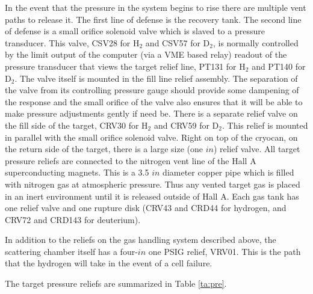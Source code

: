 \begin{safetyen}{10}{5}
In the event that the pressure in the system begins to rise there are multiple
vent paths to release it. The first line of defense is the recovery tank.
The second line of defense is a small orifice solenoid valve
which is slaved to a pressure transducer. This valve, CSV28 for H$_2$ and
CSV57 for D$_2$, 
is normally controlled by the limit
output of the computer (via a VME based relay) readout of
the pressure transducer that views the target
relief line, PT131 for H$_2$ and PT140 for D$_2$. The valve itself is mounted
in the fill line relief assembly. The separation of the valve from its
controlling pressure gauge should provide some dampening of the response
and the small orifice of the valve also ensures that it will
be able to make pressure adjustments gently if need be.
There is 
a separate relief valve on the fill side of the target, CRV30 for H$_2$ and
CRV59 for D$_2$. This relief is mounted in parallel with the small orifice 
solenoid valve. Right on top of the cryocan, on the return side of the target,
there is a large size (one $in$) relief valve.
All target pressure reliefs are connected to the
nitrogen vent line of the Hall A superconducting magnets.
This is a 3.5 $in$ diameter 
copper pipe which is filled with nitrogen gas at atmospheric pressure.
Thus any vented target gas is placed in an inert environment until it is
released outside of Hall A. Each gas tank has one relief valve and one rupture
disk (CRV43 and CRD44 for hydrogen, and CRV72 and CRD143 for deuterium).
 
In addition to the reliefs on the gas handling system described above, the
scattering chamber itself has a four-$in$ one PSIG relief, VRV01.
This is the path that the
hydrogen will take in the event of a cell failure.   

The target pressure reliefs are summarized in Table \ref{ta:pre}.


\end{safetyen}
